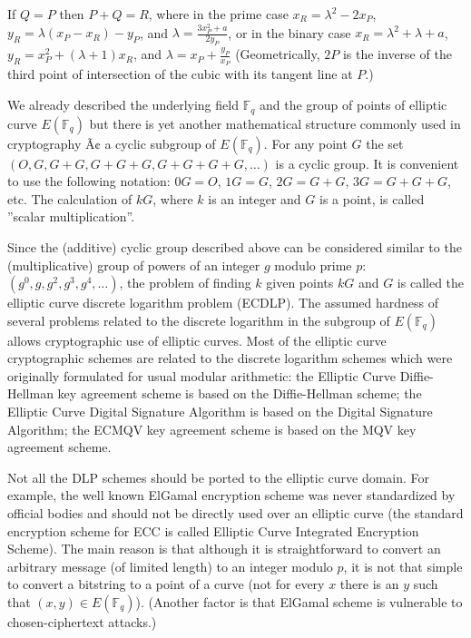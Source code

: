 \documentclass[12pt]{article}
\begin{document}
If $Q = P$ then $P + Q = R$, where in the prime case $x_R = \lambda^2 - 2 x_P$, $y_R = \lambda(x_P - x_R) - y_P$, and $\lambda = \frac{3 x_P^2 + a}{2 y_P}$, or
 in the binary case $x_R = \lambda^2 + \lambda + a$, $y_R = x_P^2 + (\lambda + 1) x_R$, and $\lambda = x_P + \frac{y_P}{x_P}$
(Geometrically, $2P$ is the inverse of the third point of intersection of the cubic with its tangent line at $P$.)

We already described the underlying field $\mathbb{F}_q$ and the group of points of elliptic curve $E(\mathbb{F}_q)$ but there is yet another mathematical structure commonly used in cryptography Ã¢ a cyclic subgroup of $E(\mathbb{F}_q)$. For any point $G$ the set
$(O, G, G+G, G+G+G, G+G+G+G, \ldots)$
is a cyclic group. It is convenient to use the following notation: $0 G = O$, $1 G = G$, $2G = G+G$, $3G = G+G+G$, etc. The calculation of $k G$, where $k$ is an integer and $G$ is a point, is called ''scalar multiplication''.

Since the (additive) cyclic group described above can be considered similar to the (multiplicative) group of powers of an integer $g$ modulo prime $p$: $(g^0, g, g^2, g^3, g^4, \ldots)$, the problem of finding $k$ given points $k G$ and $G$ is called the elliptic curve discrete logarithm problem (ECDLP). The assumed hardness of several problems related to the discrete logarithm in the subgroup of $E(\mathbb{F}_q)$ allows cryptographic use of elliptic curves. Most of the elliptic curve cryptographic schemes are related to the discrete logarithm schemes which were originally formulated for usual modular arithmetic: the Elliptic Curve Diffie-Hellman key agreement scheme is based on the Diffie-Hellman scheme; the Elliptic Curve Digital Signature Algorithm is based on the Digital Signature Algorithm; the ECMQV key agreement scheme is based on the MQV key agreement scheme.

Not all the DLP schemes should be ported to the elliptic curve domain. For example, the well known ElGamal encryption scheme was never standardized by official bodies and should not be directly used over an elliptic curve (the standard encryption scheme for ECC is called Elliptic Curve Integrated Encryption Scheme). The main reason is that although it is straightforward to convert an arbitrary message (of limited length) to an integer modulo $p$, it is not that simple to convert a bitstring to a point of a curve (not for every $x$ there is an $y$ such that $(x, y) \in E(\mathbb{F}_q)$). (Another factor is that ElGamal scheme is vulnerable to chosen-ciphertext attacks.)
\end{document}
